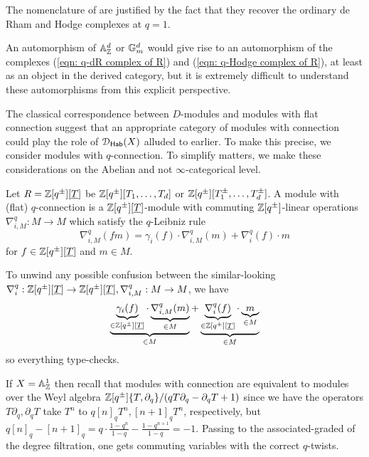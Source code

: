 \begin{remark}
    The nomenclature of  are justified by the fact that they recover the ordinary de Rham and Hodge complexes at $q=1$.
\end{remark} 
\begin{remark}
    An automorphism of $\mathbb{A}^{d}_{\mathbb{Z}}$ or $\mathbb{G}_{m}^{d}$ would give rise to an automorphism of the complexes (\ref{eqn: q-dR complex of R}) and (\ref{eqn: q-Hodge complex of R}), at least as an object in the derived category, but it is extremely difficult to understand these automorphisms from this explicit perspective. 
\end{remark}
The classical correspondence between $D$-modules and modules with flat connection suggest that an appropriate category of modules with connection could play the role of $\EuScript{D}_{\mathsf{Hab}}(X)$ alluded to earlier. To make this precise, we consider modules with $q$-connection. To simplify matters, we make these considerations on the Abelian and not $\infty$-categorical level. 
\begin{definition}\label{def: q-connections on modules}
    Let $R=\mathbb{Z}[q^{\pm}][\underline{T}]$ be $\mathbb{Z}[q^{\pm}][T_{1},\dots,T_{d}]$ or $\mathbb{Z}[q^{\pm}][T_{1}^{\pm},\dots,T_{d}^{\pm}]$. A module with (flat) $q$-connection is a $\mathbb{Z}[q^{\pm}][\underline{T}]$-module with commuting $\mathbb{Z}[q^{\pm}]$-linear operations $\nabla_{i,M}^{q}:M\to M$ which satisfy the $q$-Leibniz rule 
    $$\nabla_{i,M}^{q}(fm)=\gamma_{i}(f)\cdot\nabla_{i,M}^{q}(m)+\nabla_{i}^{q}(f)\cdot m$$
    for $f\in \mathbb{Z}[q^{\pm}][\underline{T}]$ and $m\in M$.
\end{definition}
\begin{remark}
    To unwind any possible confusion between the similar-looking $\nabla_{i}^{q}:\mathbb{Z}[q^{\pm}][\underline{T}]\to\mathbb{Z}[q^{\pm}][\underline{T}],\nabla_{i,M}^{q}:M\to M$, we have 
    $$\underbrace{\underbrace{\gamma_{i}(f)}_{\in \mathbb{Z}[q^{\pm}][\underline{T}]}\cdot\underbrace{\nabla_{i,M}^{q}(m)}_{\in M}}_{\in M}+\underbrace{\underbrace{\nabla_{i}^{q}(f)}_{\in \mathbb{Z}[q^{\pm}][\underline{T}]}\cdot\underbrace{m}_{\in M}}_{\in M}$$
    so everything type-checks. 
\end{remark}
\begin{example}
    If $X=\mathbb{A}^{1}_{\mathbb{Z}}$ then recall that modules with connection are equivalent to modules over the Weyl algebra $\mathbb{Z}[q^{\pm}]\{T,\partial_{q}\}/(qT\partial_{q}-\partial_{q}T+1)$ since we have the operators $T\partial_{q},\partial_{q}T$ take $T^{n}$ to $q[n]_{q}T^{n},[n+1]_{q}T^{n}$, respectively, but $q[n]_{q}-[n+1]_{q}=q\cdot\frac{1-q^{n}}{1-q}-\frac{1-q^{n+1}}{1-q}=-1$. Passing to the associated-graded of the degree filtration, one gets commuting variables with the correct $q$-twists. 
\end{example}
